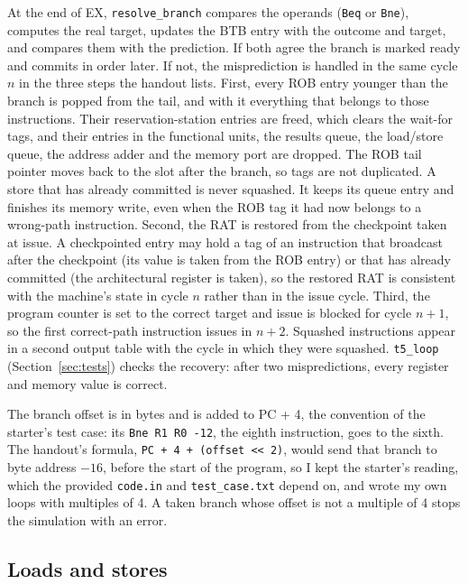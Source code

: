 \documentclass[11pt]{article}
\newcommand{\code}[1]{\texttt{#1}}
\begin{document}
At the end of EX, \code{resolve\_branch} compares the operands (\code{Beq} or \code{Bne}),
computes the real target, updates the BTB entry with the outcome and target, and compares
them with the prediction. If both agree the branch is marked ready and commits in order
later. If not, the misprediction is handled in the same cycle $n$ in the three steps the
handout lists. First, every ROB entry younger than the branch is popped from the tail, and
with it everything that belongs to those instructions. Their reservation-station entries
are freed, which clears the wait-for tags, and their entries in the functional units, the
results queue, the load/store queue, the address adder and the memory port are dropped. The
ROB tail pointer moves back to the slot after the branch, so tags are not duplicated. A store
that has already committed is never squashed. It keeps its queue entry and finishes its
memory write, even when the ROB tag it had now belongs to a wrong-path instruction.
Second, the RAT is restored from the checkpoint taken at issue. A checkpointed entry may hold
a tag of an instruction that broadcast after the checkpoint (its value is taken from the ROB
entry) or that has already committed (the architectural register is taken), so the restored
RAT is consistent with the machine's state in cycle $n$ rather than in the issue cycle. Third,
the program counter is set to the correct target and issue is blocked for cycle $n+1$, so the
first correct-path instruction issues in $n+2$. Squashed instructions appear in a second
output table with the cycle in which they were squashed. \code{t5\_loop}
(Section~\ref{sec:tests}) checks the recovery: after two mispredictions, every register and
memory value is correct.

The branch offset is in bytes and is added to PC + 4, the convention of the starter's test
case: its \code{Bne R1 R0 -12}, the eighth instruction, goes to the sixth. The handout's
formula, \code{PC + 4 + (offset <{}< 2)}, would send that branch to byte address $-16$, before
the start of the program, so I kept the starter's reading, which the provided \code{code.in}
and \code{test\_case.txt} depend on, and wrote my own loops with multiples of 4. A taken
branch whose offset is not a multiple of 4 stops the simulation with an error.

\subsection{Loads and stores}
\end{document}

